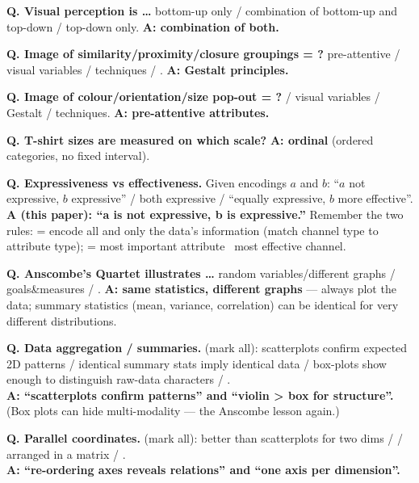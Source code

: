 \begin{qbox}
\textbf{Q. Visual perception is \dots} bottom-up only / combination of bottom-up
and top-down / top-down only. \quad\textbf{A: combination of both.}

\medskip
\textbf{Q. Image of similarity/proximity/closure groupings = ?}
pre-attentive / visual variables / techniques / .
\quad\textbf{A: Gestalt principles.}

\medskip
\textbf{Q. Image of colour/orientation/size pop-out = ?}
 / visual variables / Gestalt / techniques.
\quad\textbf{A: pre-attentive attributes.}

\medskip
\textbf{Q. T-shirt sizes are measured on which scale?}
\quad\textbf{A: ordinal} (ordered categories, no fixed interval).

\medskip
\textbf{Q. Expressiveness vs effectiveness.} Given encodings $a$ and $b$:
``$a$ not expressive, $b$ expressive'' / both expressive / ``equally expressive,
$b$ more effective''.\\
\textbf{A (this paper): ``a is not expressive, b is expressive.''} Remember the
two rules:  = encode all and only the data's information
(match channel type to attribute type);  = most important
attribute \textrightarrow\ most effective channel.

\medskip
\textbf{Q. Anscombe's Quartet illustrates \dots} random variables/different
graphs / goals\&measures / .
\quad\textbf{A: same statistics, different graphs} --- always plot the data;
summary statistics (mean, variance, correlation) can be identical for very
different distributions.

\medskip
\textbf{Q. Data aggregation / summaries.} (mark all): scatterplots confirm
expected 2D patterns / identical summary stats imply identical data / box-plots
show enough to distinguish raw-data characters / .\\
\textbf{A: ``scatterplots confirm patterns'' and ``violin > box for structure''.}
(Box plots can hide multi-modality --- the Anscombe lesson again.)

\medskip
\textbf{Q. Parallel coordinates.} (mark all): better than scatterplots for two
dims /  / arranged in a matrix /
.\\
\textbf{A: ``re-ordering axes reveals relations'' and ``one axis per dimension''.}
\end{qbox}

